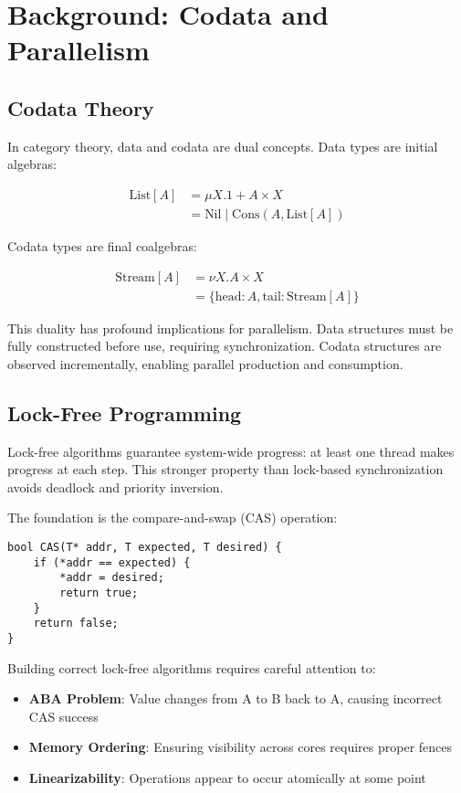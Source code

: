 \documentclass[sigconf,review,anonymous]{acmart}
\begin{document}
\section{Background: Codata and Parallelism}

\subsection{Codata Theory}

In category theory, data and codata are dual concepts. Data types are initial algebras:

\begin{align}
\text{List}[A] &= \mu X. 1 + A \times X \\
&= \text{Nil} \mid \text{Cons}(A, \text{List}[A])
\end{align}

Codata types are final coalgebras:

\begin{align}
\text{Stream}[A] &= \nu X. A \times X \\
&= \{\text{head}: A, \text{tail}: \text{Stream}[A]\}
\end{align}

This duality has profound implications for parallelism. Data structures must be fully constructed before use, requiring synchronization. Codata structures are observed incrementally, enabling parallel production and consumption.

\subsection{Lock-Free Programming}

Lock-free algorithms guarantee system-wide progress: at least one thread makes progress at each step. This stronger property than lock-based synchronization avoids deadlock and priority inversion.

The foundation is the compare-and-swap (CAS) operation:

\begin{lstlisting}
bool CAS(T* addr, T expected, T desired) {
    if (*addr == expected) {
        *addr = desired;
        return true;
    }
    return false;
}
\end{lstlisting}

Building correct lock-free algorithms requires careful attention to:
\begin{itemize}
\item \textbf{ABA Problem}: Value changes from A to B back to A, causing incorrect CAS success
\item \textbf{Memory Ordering}: Ensuring visibility across cores requires proper fences
\item \textbf{Linearizability}: Operations appear to occur atomically at some point
\end{itemize}
\end{document}
